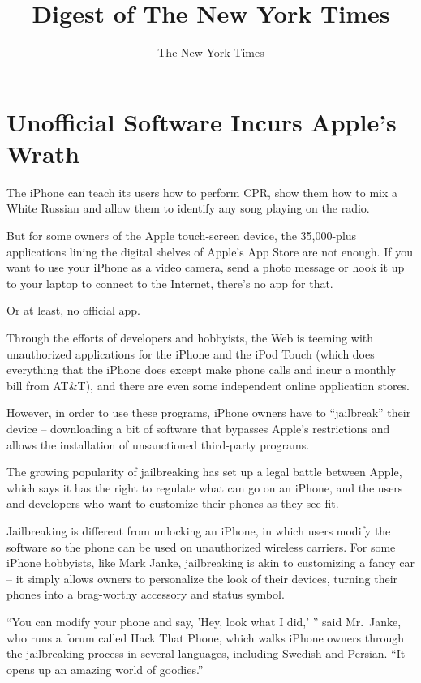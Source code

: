 \documentclass[12pt,a4paper,onecolumn]{article}
\title{Digest of The New York Times}
\author{The New York Times}
\begin{document}
\date{}

\tableofcontents
\pagebreak
\section{Unofficial Software Incurs Apple's Wrath}

The iPhone can teach its users how to perform CPR, show them how to mix a White Russian and allow
them to identify any song playing on the radio.

But for some owners of the Apple touch-screen device, the 35,000-plus applications lining the
digital shelves of Apple's App Store are not enough. If you want to use your iPhone as a video
camera, send a photo message or hook it up to your laptop to connect to the Internet, there's no app
for that.

Or at least, no official app.

Through the efforts of developers and hobbyists, the Web is teeming with unauthorized applications
for the iPhone and the iPod Touch (which does everything that the iPhone does except make phone
calls and incur a monthly bill from AT\&T), and there are even some independent online application
stores.

However, in order to use these programs, iPhone owners have to ``jailbreak'' their device --
downloading a bit of software that bypasses Apple's restrictions and allows the installation of
unsanctioned third-party programs.

The growing popularity of jailbreaking has set up a legal battle between Apple, which says it has
the right to regulate what can go on an iPhone, and the users and developers who want to customize
their phones as they see fit.

Jailbreaking is different from unlocking an iPhone, in which users modify the software so the phone
can be used on unauthorized wireless carriers. For some iPhone hobbyists, like Mark Janke,
jailbreaking is akin to customizing a fancy car -- it simply allows owners to personalize the look
of their devices, turning their phones into a brag-worthy accessory and status symbol.

``You can modify your phone and say, 'Hey, look what I did,' '' said Mr.~Janke, who runs a forum
called Hack That Phone, which walks iPhone owners through the jailbreaking process in several
languages, including Swedish and Persian. ``It opens up an amazing world of goodies.''
\end{document}
